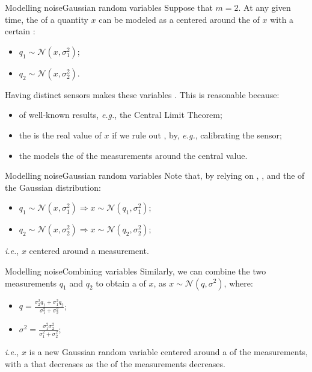 \begin{frame}{Modelling noise}{Gaussian random variables}
  Suppose that $m=2$. At any given time, the  of a quantity $x$ can be modeled as a  centered around the  of $x$ with a certain :
  \begin{itemize}
    \item $q_1 \sim \mathcal{N}(x,\sigma_1^2)$;
    \item $q_2 \sim \mathcal{N}(x,\sigma_2^2)$.
  \end{itemize}
  Having distinct sensors makes these variables . This is reasonable because:
  \begin{itemize}
    \item of well-known results, \emph{e.g.}, the Central Limit Theorem;
    \item the  is the real value of $x$ if we rule out , by, \emph{e.g.}, calibrating the sensor;
    \item the  models the  of the measurements around the central value.
  \end{itemize}
\end{frame}
\begin{frame}{Modelling noise}{Gaussian random variables}
  Note that, by relying on , , and the  of the Gaussian distribution:
  \begin{itemize}
    \item $q_1 \sim \mathcal{N}(x,\sigma_1^2) \Rightarrow x \sim \mathcal{N}(q_1,\sigma_1^2)$;
    \item $q_2 \sim \mathcal{N}(x,\sigma_2^2) \Rightarrow x \sim \mathcal{N}(q_2,\sigma_2^2)$;
  \end{itemize}
  \emph{i.e.}, $x$  centered around a measurement.
\end{frame}
\begin{frame}{Modelling noise}{Combining variables}
  Similarly, we can combine the two measurements $q_1$ and $q_2$ to obtain a  of $x$, as $x \sim \mathcal{N}(q,\sigma^2)$, where:
  \begin{itemize}
    \item $q = \frac{\sigma_2^2 q_1 + \sigma_1^2 q_2}{\sigma_1^2 + \sigma_2^2}$;
    \item $\sigma^2 = \frac{\sigma_1^2 \sigma_2^2}{\sigma_1^2 + \sigma_2^2}$;
  \end{itemize}
  \emph{i.e.}, $x$ is a new Gaussian random variable centered around a  of the measurements, with a  that decreases as the  of the measurements decreases.
\end{frame}

